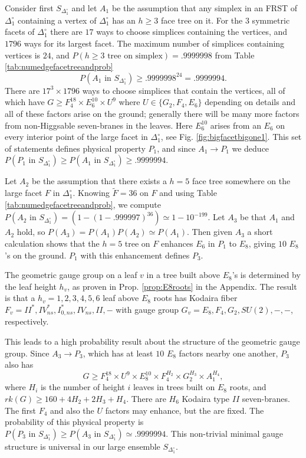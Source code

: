 \documentclass[aps,prl,twocolumn, superscriptaddress,groupedaddress,nofootinbib]{revtex4}
\newcommand{\sdoc}{S_{\Delta_1^\circ}}
\newcommand{\doc}{{\Delta_1^\circ}}
\newcommand{\textin}{\,\, \text{in} \,\,}
\begin{document}
Consider first $\sdoc$ and let $A_1$ be the assumption that any simplex in an FRST 
of $\doc$ containing a vertex of $\doc$ has an $h\geq 3$ face tree on it. 
For the $3$ symmetric facets of $\doc$ there are $17$ ways to choose simplices
containing the vertices, and $1796$ ways for its largest facet. The maximum
number of simplices containing vertices is $24$, and $P(h\geq 3 \,\, \text{tree on simplex}) = .9999998$ from Table \ref{tab:numedgefacetreeandprob}
\begin{equation}
P(A_1\textin\sdoc)\geq .9999998^{24}=.9999994.
\end{equation}
There are $17^3\times1796$ ways to choose simplices that contain the vertices,
all of which have $G\geq F_4^{18}\times E_6^{10}\times U^9$ where 
$U\in\{G_2,F_4,E_6\}$ depending on details and all of these factors arise on
the ground; generally there will be many more factors from non-Higgsable seven-branes
in the leaves. Here $E_6^{10}$ arises from an $E_6$ on every interior point
of the large facet in $\doc$, see Fig. \ref{fig:bigfacetbigone1}. This set of
statements defines physical property $P_1$, and since $A_1\to P_1$
we deduce $P(P_1\textin \sdoc)\geq P(A_1\textin \sdoc) \geq .9999994$.

Let $A_2$ be the assumption that there exists a $h=5$ face tree somewhere
on the large facet $F$ in $\doc$. Knowing $\tilde F=36$ on $F$ and using
Table \ref{tab:numedgefacetreeandprob}, we compute $P(A_2 \textin \sdoc)=(1-(1-.999997)^{36})\simeq 1-10^{-199}.$ Let $A_3$ be that $A_1$ and $A_2$ hold, so 
$P(A_3)=P(A_1)P(A_2)\simeq P(A_1)$. Then given $A_3$ a short calculation shows 
that the  $h=5$ tree on $F$ 
enhances $E_6$ in $P_1$ to $E_8$, giving $10$ $E_8$'s on the ground. $P_1$ with this enhancement defines $P_3$. 

The  geometric gauge group on a leaf $v$ in a tree built above $E_8$'s
is determined by the leaf height $h_v$, as proven in Prop. \ref{prop:E8roots} in the Appendix. 
The result is that a $h_v=1,2,3,4,5,6$ leaf
above $E_8$ roots has Kodaira fiber $F_v=II^*,IV^*_{ns},I^*_{0,ns},IV_{ns},II,-$
with gauge group $G_v=E_8,F_4,G_2,SU(2),-,-$, respectively.

This leads to a high probability result about the structure of the geometric gauge group.
Since $A_3\to P_3$, which has at least $10$ $E_8$ factors nearby one another, $P_3$
also has
\begin{equation}
G\geq F_4^{18}\times U^9\times E_8^{10}\times F_4^{H_2}\times G_2^{H_3}\times A_1^{H_4},
\end{equation}
where $H_i$ is the number of height $i$ leaves in trees built on $E_8$ roots,
and $rk(G)\geq 160+4H_2+2H_3+H_4$.
There are $H_6$ Kodaira type $II$ seven-branes. The first $F_4$ and also
the $U$ factors may enhance, but the  are fixed. The probability
of this physical property is $P(P_3\textin \sdoc)\geq P(A_3\textin \sdoc) \simeq .9999994$. This non-trivial minimal gauge structure is universal in our large ensemble $\sdoc$.
\end{document}

